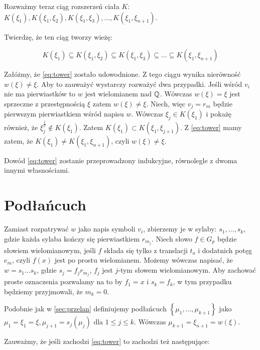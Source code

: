 Rozważmy teraz ciąg rozszerzeń ciała $K$:
$
K\left(\xi_1\right),
K\left(\xi_1, \xi_2\right),
K\left(\xi_1, \xi_3\right),
\ldots,
K\left(\xi_1, \xi_{n+1}\right)$.

Twierdzę, że ten ciąg tworzy wieżę:

\begin{equation}
K\left(\xi_1\right) \subseteq
K\left(\xi_1, \xi_2\right) \subseteq
K\left(\xi_1, \xi_3\right) \subseteq 
\ldots
\subseteq
K\left(\xi_1, \xi_{n+1}\right)
\label{eq:tower}
\end{equation}

Załóżmy, że \ref{eq:tower} zostało udowodnione. Z tego ciągu wynika nierówność
$w\left(\xi\right) \neq \xi$. Aby to zauważyć wystarczy rozważyć dwa przypadki.
Jeśli wśród $v_i$ nie ma pierwiastków to $w$ jest wielomianem nad $\mathbb{Q}$. Wówczas
$w(\xi) = \xi$ jest sprzeczne z przestępnością $\xi$ zatem $w(\xi) \neq \xi$.
Niech, więc $v_j = r_m$ będzie pierwszym pierwiastkiem wśród napisu $w$. Wówczas
$\xi_j \in K\left(\xi_1\right)$ i pokażę również, że $\xi_{j}^{\frac{1}{p}} \not
\in K(\xi_1)$. Zatem $K\left(\xi_1\right) \subset K\left(\xi_1,
\xi_{j+1}\right)$. Z \ref{eq:tower} mamy zatem, że $K\left(\xi_1\right) \neq
  K\left(\xi_1, \xi_{n+1}\right)$, czyli $w(\xi) \neq \xi$.

Dowód \ref{eq:tower} zostanie przeprowadzony indukcyjne, równolegle z dwoma
innymi własnościami.

\section{Podłańcuch}

Zamiast rozpatrywać $w$ jako napis symboli $v_i$, zbierzemy je w sylaby: $s_1,
\ldots, s_k$, gdzie każda sylaba kończy się pierwiastkiem $r_{m_j}$. Niech słowo
$f \in G_p$ będzie słowiem wielomianowym, jeśli $f$ składa się tylko z
translacji $t_a$ i dodatnich potęg $e_m$, czyli $f(x)$ jest po prostu
wielomianem. Możemy wówczas napisać, że $w = s_1\ldots s_k$, gdzie $s_j =
f_jr_{m_j}$, $f_j$ jest $j$-tym słowem wielomianowym. Aby zachować proste
oznaczenia pozwalamy na to by $f_1 = x$  i $s_k = f_k$, w tym przypadku będziemy
przyjmowali, że $m_k = 0$. 

Podobnie jak w 
\ref{sec:przelan} definiujemy podłańcuch $\left\{\mu_1, \ldots,
\mu_{k+1}\right\}$ jako $\mu_1 = \xi_1 = \xi, \mu_{j+1} = s_j\left(\mu_j\right)$
dla $1 \leq j \leq k$. Wówczas $\mu_{k+1} = \xi_{n+1} = w(\xi)$.

Zauważmy, że jeśli zachodzi \ref{eq:tower} to zachodzi też następujące:

